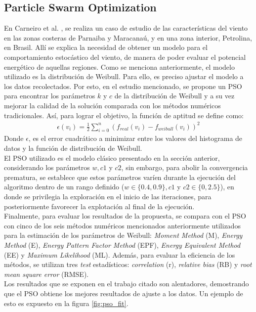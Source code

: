  \subsection{Particle Swarm Optimization}
 En Carneiro et al. \cite{Carneiro15}, se realiza un caso de estudio de las características del viento en las zonas costeras de Parnaiba y Maracanaú, y en una zona interior, Petrolina, en Brasil. Allí se explica la necesidad de obtener un modelo para el comportamiento estocástico del viento, de manera de poder evaluar el potencial energético de aquellas regiones. Como se menciona anteriormente, el modelo utilizado es la distribución de Weibull. Para ello, es preciso ajustar el modelo a los datos recolectados. Por esto, en el estudio mencionado, se propone un PSO para encontrar los parámetros $k$ y $c$ de la distribución de Weibull y a su vez mejorar la calidad de la solución comparada con los métodos numéricos tradicionales. Así, para lograr el objetivo, la función de aptitud se define como:
\begin{align}\label{eq:PSO_FO}
    \epsilon(v_i) = \frac{1}{2}\sum_{i=0}^{n}(f_{real}(v_i) - f_{weibull}(v_i))^2
\end{align}
Donde $\epsilon$, es el error cuadrático a minimizar entre los valores del histograma de datos y la función de distribución de Weibull.\\
El PSO utilizado es el modelo clásico presentado en la sección anterior, considerando los parámetros $w, c1$ y $c2$, sin embargo, para abolir la convergencia prematura, se establece que estos parámetros varíen durante la ejecución del algoritmo dentro de un rango definido ($w \in \{0.4, 0.9\}, c1$ y $c2 \in \{0, 2.5\}$), en donde se privilegia la exploración en el inicio de las iteraciones, para posteriormente favorecer la explotación al final de la ejecución.\\
Finalmente, para evaluar los resultados de la propuesta, se compara con el PSO con cinco de los seis métodos numéricos mencionados anteriormente utilizados para la estimación de los parámetros de Weibull: \emph{Moment Method} (M), \emph{Energy Method} (E), \emph{Energy Pattern Factor Method} (EPF), \emph{Energy Equivalent Method} (EE) y \emph{Maximum Likelihood} (ML). Además, para evaluar la eficiencia de los métodos, se utilizan tres \emph{test} estadísticos: \emph{correlation} (r), \emph{relative bias} (RB) y \emph{root mean square error} (RMSE).\\
Los resultados que se exponen en el trabajo citado son alentadores, demostrando que el PSO obtiene los mejores resultados de ajuste a los datos. Un ejemplo de esto es expuesto en la figura \ref{fig:pso_fit}.
